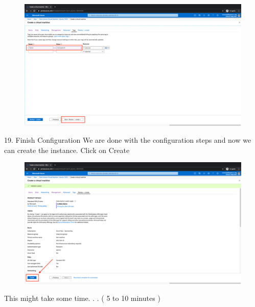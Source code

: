 \begin{figure}[H]
\begin{center} 
\includegraphics[scale=0.20]{figures/vm22}
\end{center}
\end{figure}

19. Finish Configuration
We are done with the configuration steps and now we can create the instance. Click on Create

\begin{figure}[H]
\begin{center} 
\includegraphics[scale=0.20]{figures/vm23}
\end{center}
\end{figure}

This might take some time. . . ( 5 to 10 minutes )

